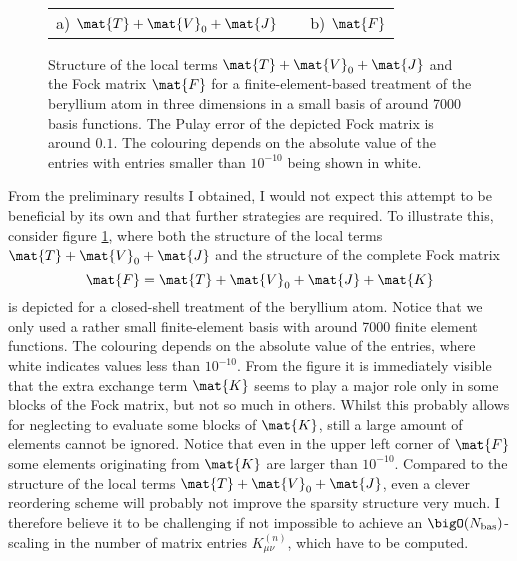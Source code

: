 \begin{figure}
	\centering
	\\[-0.7em]
	\begin{tabularx}{0.67\textwidth}{XcX}
		a) $\mat{T} + \mat{V}_0 + \mat{J}$ & \hspace{0.27\textwidth} &
		\hspace{0.02\textwidth}b) $\mat{F}$
	\end{tabularx}
	\caption[Local terms and Fock matrix for a finite-element-based Hartree-Fock]
		{Structure of the local terms $\mat{T}+\mat{V}_0 + \mat{J}$
		and the Fock matrix $\mat{F}$
		for a finite-element-based \HF treatment
		of the beryllium atom in three dimensions
		in a small \FE basis of around 7000 basis functions.
		The Pulay error of the depicted Fock matrix
		is around $0.1$.
		The colouring depends on the absolute value of the entries
		with entries smaller than $10^{-10}$ being shown in white.
	}
	\label{fig:StructureFiniteElementFock}
\end{figure}

From the preliminary results I obtained,
I would not expect this attempt to be beneficial by its own
and that further strategies are required.
To illustrate this, consider figure \ref{fig:StructureFiniteElementFock},
where both the structure of the local terms $\mat{T}+\mat{V}_0 + \mat{J}$
and the structure of the complete Fock matrix
\[ \mat{F} = \mat{T}+\mat{V}_0 + \mat{J} + \mat{K} \]
is depicted for a closed-shell treatment of the beryllium atom.
Notice that we only used a rather small finite-element basis with
around 7000 finite element functions.
The colouring depends on the absolute value of the entries,
where white indicates values less than $10^{-10}$.
From the figure it is immediately visible
that the extra exchange term $\mat{K}$
seems to play a major role only in some blocks of the Fock matrix,
but not so much in others.
Whilst this probably allows for neglecting to evaluate some blocks of $\mat{K}$,
still a large amount of elements cannot be ignored.
Notice that even in the upper left corner of $\mat{F}$
some elements originating from $\mat{K}$ are larger than $10^{-10}$.
Compared to the structure of the local terms $\mat{T}+\mat{V}_0 + \mat{J}$,
even a clever reordering scheme
will probably not improve the sparsity structure very much.
I therefore believe it to be challenging if not impossible
to achieve an $\bigO(\Nbas)$-scaling in the number
of matrix entries $K^{(n)}_{\mu\nu}$,
which have to be computed.

